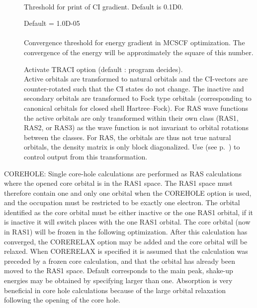 \begin{description}
\item[]
   \\
  Threshold for print of CI gradient. Default is 0.1D0.

\item[]
  Default = 1.0D-05\\
   \\
  Convergence threshold for energy gradient in MCSCF optimization.
  The convergence of the energy will be approximately the square of this
  number.

\item[]
  Activate TRACI option (default : program decides).\\
  Active orbitals are transformed to natural orbitals and the CI-vectors
  are counter-rotated such that the CI states do not change.  The
  inactive and secondary orbitals are transformed to Fock type orbitals
  (corresponding to canonical orbitals for closed shell Hartree--Fock).
  For RAS wave functions the active orbitals are only transformed
  within their own class (RAS1, RAS2, or RAS3) as the wave function is
  not invariant to orbital rotations between the classes.  For RAS, the
  orbitals are thus not true natural orbitals, the density matrix is
  only block diagonalized.  Use  (see
  p.~\pageref{ref-priinp})   to control output from this
  transformation.

\end{description}



COREHOLE: Single core-hole calculations are
performed as RAS calculations where the opened core orbital is in
the RAS1 space.  The RAS1 space must therefore contain one and
only one orbital when the COREHOLE option is used, and the
occupation must be restricted to be exactly one electron. The
orbital identified as the core orbital must be either inactive or
the one RAS1 orbital, if it is inactive it will switch places with
the one RAS1 orbital. The core orbital (now in RAS1) will be
frozen in the following optimization. After this calculation has
converged, the CORERELAX option may be added and the core orbital
will be relaxed.  When CORERELAX is
specified it is assumed that the calculation was preceded by a
frozen core calculation, and that the
orbital has already been moved to the RAS1 space. Default
corresponds to the main peak, shake-up energies may be obtained by
specifying  larger than one. Absorption is
very beneficial in core hole calculations because of the large
orbital relaxation following the opening of the core hole.

